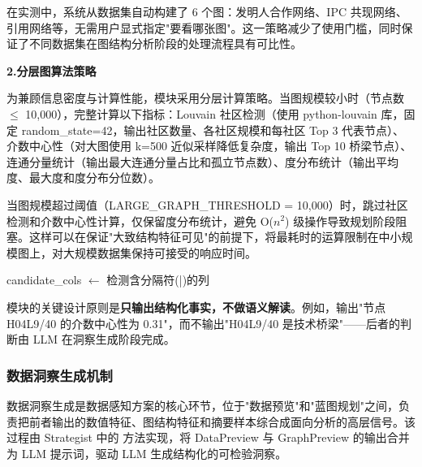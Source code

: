 在实测中，系统从数据集自动构建了 6 个图：发明人合作网络、IPC 共现网络、引用网络等，无需用户显式指定"要看哪张图"。这一策略减少了使用门槛，同时保证了不同数据集在图结构分析阶段的处理流程具有可比性。

\noindent\textbf{2.分层图算法策略}

为兼顾信息密度与计算性能，模块采用分层计算策略。当图规模较小时（节点数 $\leq$ 10,000），完整计算以下指标：Louvain 社区检测（使用 python-louvain 库，固定 random\_state=42，输出社区数量、各社区规模和每社区 Top 3 代表节点）、介数中心性（对大图使用 k=500 近似采样降低复杂度，输出 Top 10 桥梁节点）、连通分量统计（输出最大连通分量占比和孤立节点数）、度分布统计（输出平均度、最大度和度分布分位数）。

当图规模超过阈值（LARGE\_GRAPH\_\allowbreak THRESHOLD = 10,000）时，跳过社区检测和介数中心性计算，仅保留度分布统计，避免 O($n^2$) 级操作导致规划阶段阻塞。这样可以在保证"大致结构特征可见"的前提下，将最耗时的运算限制在中小规模图上，对大规模数据集保持可接受的响应时间。

\begin{algorithm}[H]
\caption{图结构预览生成}

candidate\_cols $\leftarrow$ 检测含分隔符(|)的列\;
\;
\end{algorithm}

模块的关键设计原则是\textbf{只输出结构化事实，不做语义解读}。例如，输出"节点 H04L9/40 的介数中心性为 0.31"，而不输出"H04L9/40 是技术桥梁"——后者的判断由 LLM 在洞察生成阶段完成。

\subsubsection{数据洞察生成机制}

数据洞察生成是数据感知方案的核心环节，位于"数据预览"和"蓝图规划"之间，负责把前者输出的数值特征、图结构特征和摘要样本综合成面向分析的高层信号。该过程由 Strategist 中的  方法实现，将 DataPreview 与 GraphPreview 的输出合并为 LLM 提示词，驱动 LLM 生成结构化的可检验洞察。

